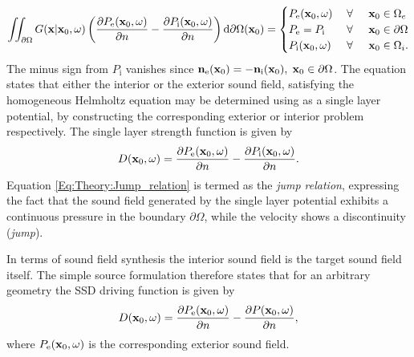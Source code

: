 \begin{equation}
\iint_{\partial \Omega} 
G(\mathbf{x}|\mathbf{x}_0,\omega) 
\left(
\frac{\partial P_{\mathrm{e}}(\mathbf{x}_0,\omega)}{\partial n} - \frac{\partial P_{\mathrm{i}}(\mathbf{x}_0,\omega)}{\partial n} 
\right)
\mathrm{d} \partial \Omega ( \mathbf{x}_0)
= 
\begin{cases} 
P_{\mathrm{e}}(\mathbf{x}_0,\omega)           & \hspace{1mm} \forall \hspace{5mm}  \mathbf{x}_0 \in \Omega_e  	   \\
P_{\mathrm{e}}=P_{\mathrm{i}} & \hspace{1mm} \forall \hspace{5mm}  \mathbf{x}_0 \in \partial \Omega  \\
P_{\mathrm{i}}(\mathbf{x}_0,\omega) 			& \hspace{1mm} \forall \hspace{5mm}  \mathbf{x}_0 \in \Omega_i.
\end{cases}
\end{equation}
The minus sign from $P_{\mathrm{i}}$ vanishes since $\mathbf{n}_{\mathrm{e}}(\mathbf{x}_0) = -\mathbf{n}_{\mathrm{i}}(\mathbf{x}_0), \hspace{1mm} {\mathbf{x}_0}\in \partial \Omega$. The equation states that either the interior or the exterior sound field, satisfying the homogeneous Helmholtz equation may be determined using as a single layer potential, by constructing the corresponding exterior or interior problem respectively. The single layer strength function is given by 
\begin{equation}
D(\mathbf{x}_0,\omega) = 
\frac{\partial P_{\mathrm{e}}(\mathbf{x}_0,\omega)}{\partial n} - \frac{\partial P_{\mathrm{i}}(\mathbf{x}_0,\omega)}{\partial n}.
\label{Eq:Theory:Jump_relation}
\end{equation}
Equation \eqref{Eq:Theory:Jump_relation} is termed as the \emph{jump relation}, expressing the fact that the sound field generated by the single layer potential exhibits a continuous pressure in the boundary $\partial \Omega$, while the velocity shows a discontinuity (\emph{jump}).

In terms of sound field synthesis the interior sound field is the target sound field itself. The simple source formulation therefore states that for an arbitrary geometry the SSD driving function is given by
\begin{equation}
D(\mathbf{x}_0,\omega) = 
\frac{\partial P_{\mathrm{e}}(\mathbf{x}_0,\omega)}{\partial n} - \frac{\partial P(\mathbf{x}_0,\omega)}{\partial n},
\end{equation}
where $P_{\mathrm{e}}(\mathbf{x}_0,\omega)$ is the corresponding exterior sound field.